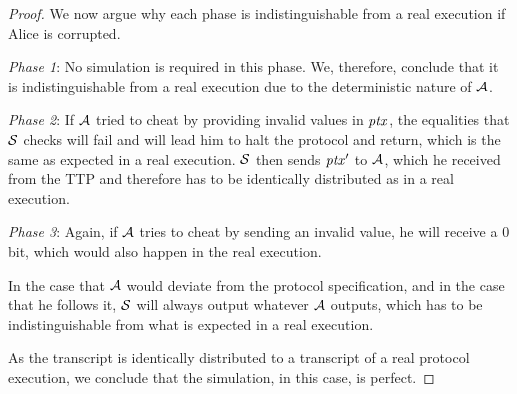 \begin{proof}
    We now argue why each phase is indistinguishable from a real execution if Alice is corrupted.

    \begin{asparaitem}
        \item \textit{Phase 1}: No simulation is required in this phase.
        We, therefore, conclude that it is indistinguishable from a real execution due to the deterministic nature of $\mathcal{A}$.
        \item \textit{Phase 2}: If $\mathcal{A}$ tried to cheat by providing invalid values in $\mathit{ptx}$, the equalities that $\mathcal{S}$ checks will fail and will lead him to halt the protocol and return, which is the same as expected in a real execution.
        $\mathcal{S}$ then sends ${\mathit{ptx}}'$ to $\mathcal{A}$, which he received from the TTP and therefore has to be identically distributed as in a real execution.
        \item \textit{Phase 3}: Again, if $\mathcal{A}$ tries to cheat by sending an invalid value, he will receive a 0 bit, which would also happen in the real execution.
        \item In the case that $\mathcal{A}$ would deviate from the protocol specification, and in the case that he follows it, $\mathcal{S}$ will always output whatever $\mathcal{A}$ outputs, which has to be indistinguishable from what is expected in a real execution.
    \end{asparaitem}

    As the transcript is identically distributed to a transcript of a real protocol execution, we conclude that the simulation, in this case, is perfect.


\end{proof}
